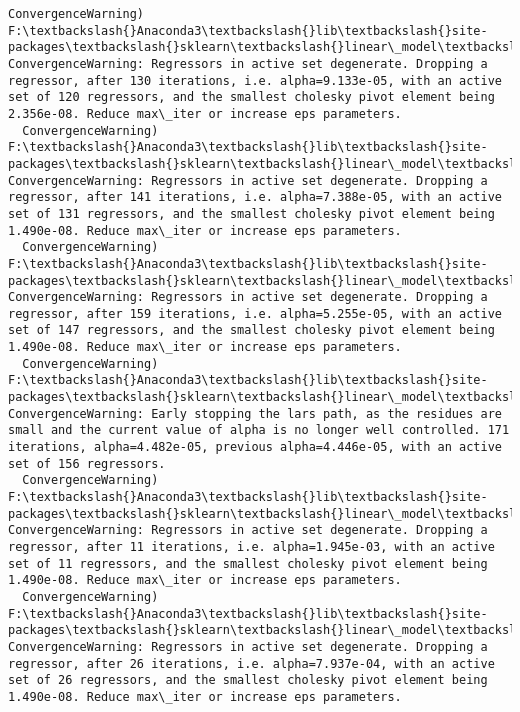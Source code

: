 \documentclass[11pt]{article}
\begin{document}
\begin{Verbatim}[commandchars=\\\{\}]
  ConvergenceWarning)
F:\textbackslash{}Anaconda3\textbackslash{}lib\textbackslash{}site-packages\textbackslash{}sklearn\textbackslash{}linear\_model\textbackslash{}least\_angle.py:313: ConvergenceWarning: Regressors in active set degenerate. Dropping a regressor, after 130 iterations, i.e. alpha=9.133e-05, with an active set of 120 regressors, and the smallest cholesky pivot element being 2.356e-08. Reduce max\_iter or increase eps parameters.
  ConvergenceWarning)
F:\textbackslash{}Anaconda3\textbackslash{}lib\textbackslash{}site-packages\textbackslash{}sklearn\textbackslash{}linear\_model\textbackslash{}least\_angle.py:313: ConvergenceWarning: Regressors in active set degenerate. Dropping a regressor, after 141 iterations, i.e. alpha=7.388e-05, with an active set of 131 regressors, and the smallest cholesky pivot element being 1.490e-08. Reduce max\_iter or increase eps parameters.
  ConvergenceWarning)
F:\textbackslash{}Anaconda3\textbackslash{}lib\textbackslash{}site-packages\textbackslash{}sklearn\textbackslash{}linear\_model\textbackslash{}least\_angle.py:313: ConvergenceWarning: Regressors in active set degenerate. Dropping a regressor, after 159 iterations, i.e. alpha=5.255e-05, with an active set of 147 regressors, and the smallest cholesky pivot element being 1.490e-08. Reduce max\_iter or increase eps parameters.
  ConvergenceWarning)
F:\textbackslash{}Anaconda3\textbackslash{}lib\textbackslash{}site-packages\textbackslash{}sklearn\textbackslash{}linear\_model\textbackslash{}least\_angle.py:339: ConvergenceWarning: Early stopping the lars path, as the residues are small and the current value of alpha is no longer well controlled. 171 iterations, alpha=4.482e-05, previous alpha=4.446e-05, with an active set of 156 regressors.
  ConvergenceWarning)
F:\textbackslash{}Anaconda3\textbackslash{}lib\textbackslash{}site-packages\textbackslash{}sklearn\textbackslash{}linear\_model\textbackslash{}least\_angle.py:313: ConvergenceWarning: Regressors in active set degenerate. Dropping a regressor, after 11 iterations, i.e. alpha=1.945e-03, with an active set of 11 regressors, and the smallest cholesky pivot element being 1.490e-08. Reduce max\_iter or increase eps parameters.
  ConvergenceWarning)
F:\textbackslash{}Anaconda3\textbackslash{}lib\textbackslash{}site-packages\textbackslash{}sklearn\textbackslash{}linear\_model\textbackslash{}least\_angle.py:313: ConvergenceWarning: Regressors in active set degenerate. Dropping a regressor, after 26 iterations, i.e. alpha=7.937e-04, with an active set of 26 regressors, and the smallest cholesky pivot element being 1.490e-08. Reduce max\_iter or increase eps parameters.

\end{Verbatim}
\end{document}
